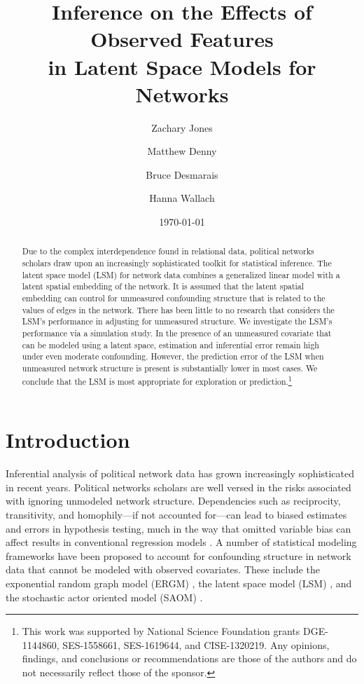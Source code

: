 \documentclass[11pt]{article}
\title{\vspace{-2cm} Inference on the Effects of Observed Features 
\\ in Latent Space Models for Networks }
\author{ Zachary Jones \and Matthew Denny \and Bruce Desmarais \and Hanna Wallach} \date{\today}
\begin{document}
\maketitle




\begin{abstract}

\noindent Due to the complex interdependence found in relational data, political networks scholars draw upon an increasingly sophisticated toolkit for statistical inference. The latent space model (LSM) for network data combines a generalized linear model with a latent spatial embedding of the network. It is assumed that the latent spatial embedding can control for unmeasured confounding structure that is related to the values of edges in the network. There has been little to no research that considers the LSM's performance in adjusting for unmeasured structure. We investigate the LSM's performance via a simulation study. In the presence of an unmeasured covariate that can be modeled using a latent space, estimation and inferential error remain high under even moderate confounding. However, the prediction error of the LSM when unmeasured network structure is present is substantially lower in most cases. We conclude that the LSM is most appropriate for exploration or prediction.\footnote{This work was supported by National Science Foundation grants DGE-1144860, SES-1558661, SES-1619644, and CISE-1320219. Any opinions, findings, and conclusions or recommendations are those of the authors and do not necessarily reflect those of the sponsor.}

\end{abstract}
\thispagestyle{empty}
\section{Introduction}

Inferential analysis of political network data has grown increasingly sophisticated in recent years. Political networks scholars are well versed in the risks associated with ignoring unmodeled network structure. Dependencies such as reciprocity, transitivity, and homophily---if not accounted for---can lead to biased estimates and errors in hypothesis testing, much in the way that omitted variable bias can affect results in conventional regression models \citep{ward2007disputes,kinne2014,cranmerisq,hays2010spatial}. A number of statistical modeling frameworks have been proposed to account for confounding structure in network data that cannot be modeled with observed covariates. These include the exponential random graph model (ERGM) \citep[e.g., ][]{lazer2010,cranmer2011pa,desmarais2012psj}, the latent space model (LSM) \citep[e.g., ][]{ward2007disputes,ward2007persistent,kirkland2012multimember}, and the stochastic actor oriented model (SAOM) \citep[e.g., ][]{berardo2010ajps,kinne2014}. 
\end{document}
